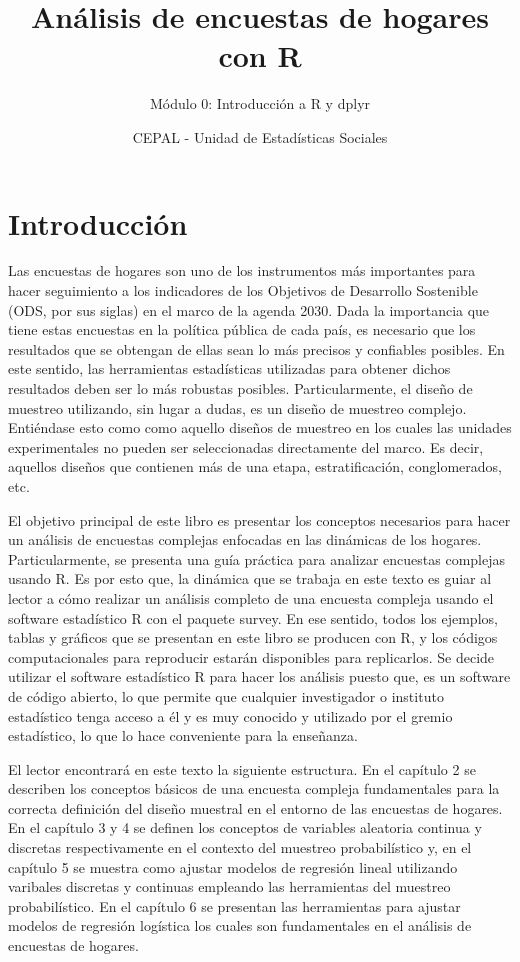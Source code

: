 \documentclass[
]{article}
\title{Análisis de encuestas de hogares con R}
\subtitle{Módulo 0: Introducción a R y dplyr}
\author{}
\date{\vspace{-2.5em}CEPAL - Unidad de Estadísticas Sociales}
\begin{document}
\maketitle

\hypertarget{introducciuxf3n}{%
\section{Introducción}\label{introducciuxf3n}}

Las encuestas de hogares son uno de los instrumentos más importantes
para hacer seguimiento a los indicadores de los Objetivos de Desarrollo
Sostenible (ODS, por sus siglas) en el marco de la agenda 2030. Dada la
importancia que tiene estas encuestas en la política pública de cada
país, es necesario que los resultados que se obtengan de ellas sean lo
más precisos y confiables posibles. En este sentido, las herramientas
estadísticas utilizadas para obtener dichos resultados deben ser lo más
robustas posibles. Particularmente, el diseño de muestreo utilizando,
sin lugar a dudas, es un diseño de muestreo complejo. Entiéndase esto
como como aquello diseños de muestreo en los cuales las unidades
experimentales no pueden ser seleccionadas directamente del marco. Es
decir, aquellos diseños que contienen más de una etapa, estratificación,
conglomerados, etc.

El objetivo principal de este libro es presentar los conceptos
necesarios para hacer un análisis de encuestas complejas enfocadas en
las dinámicas de los hogares. Particularmente, se presenta una guía
práctica para analizar encuestas complejas usando R. Es por esto que, la
dinámica que se trabaja en este texto es guiar al lector a cómo realizar
un análisis completo de una encuesta compleja usando el software
estadístico R con el paquete survey. En ese sentido, todos los ejemplos,
tablas y gráficos que se presentan en este libro se producen con R, y
los códigos computacionales para reproducir estarán disponibles para
replicarlos. Se decide utilizar el software estadístico R para hacer los
análisis puesto que, es un software de código abierto, lo que permite
que cualquier investigador o instituto estadístico tenga acceso a él y
es muy conocido y utilizado por el gremio estadístico, lo que lo hace
conveniente para la enseñanza.

El lector encontrará en este texto la siguiente estructura. En el
capítulo 2 se describen los conceptos básicos de una encuesta compleja
fundamentales para la correcta definición del diseño muestral en el
entorno de las encuestas de hogares. En el capítulo 3 y 4 se definen los
conceptos de variables aleatoria continua y discretas respectivamente en
el contexto del muestreo probabilístico y, en el capítulo 5 se muestra
como ajustar modelos de regresión lineal utilizando varibales discretas
y continuas empleando las herramientas del muestreo probabilístico. En
el capítulo 6 se presentan las herramientas para ajustar modelos de
regresión logística los cuales son fundamentales en el análisis de
encuestas de hogares.
\end{document}
